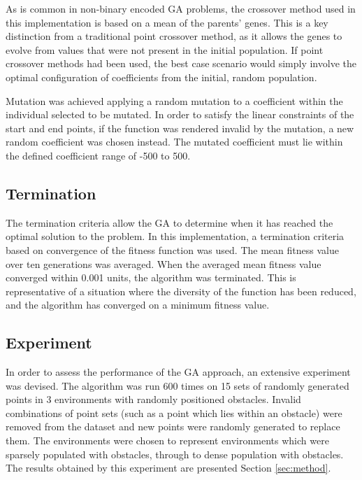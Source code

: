 As is common in non-binary encoded GA problems, the crossover method used in this implementation is based on a mean of the parents' genes. This is a key distinction from a traditional point crossover method, as it allows the genes to evolve from values that were not present in the initial population. If point crossover methods had been used, the best case scenario would simply involve the optimal configuration of coefficients from the initial, random population.

Mutation was achieved applying a random mutation to a coefficient within the individual selected to be mutated. In order to satisfy the linear constraints of the start and end points, if the function was rendered invalid by the mutation, a new random coefficient was chosen instead. The mutated coefficient must lie within the defined coefficient range of -500 to 500.

\subsection{Termination}
The termination criteria allow the GA to determine when it has reached the optimal solution to the problem. In this implementation, a termination criteria based on convergence of the fitness function was used. The mean fitness value over ten generations was averaged. When the averaged mean fitness value converged within 0.001 units, the algorithm was terminated. This is representative of a situation where the diversity of the function has been reduced, and the algorithm has converged on a minimum fitness value.

\subsection{Experiment} \label{sec:experiment}
In order to assess the performance of the GA approach, an extensive experiment was devised. The algorithm was run 600 times on 15 sets of randomly generated points in 3 environments with randomly positioned obstacles. Invalid combinations of point sets (such as a point which lies within an obstacle) were removed from the dataset and new points were randomly generated to replace them. The environments were chosen to represent environments which were sparsely populated with obstacles, through to dense population with obstacles. The results obtained by this experiment are presented Section \ref{sec:method}.
